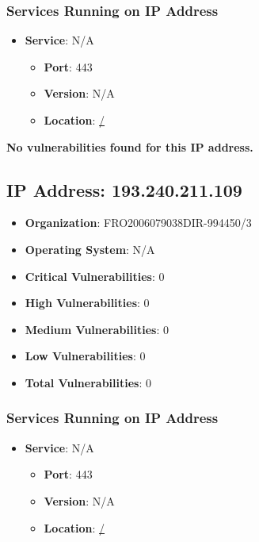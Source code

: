 \documentclass{article}
\begin{document}
\subsubsection*{Services Running on IP Address}

\begin{itemize}
    
        \item \textbf{Service}: N/A
        \begin{itemize}
            \item \textbf{Port}: 443
            \item \textbf{Version}:  N/A 
            \item \textbf{Location}: \href{ / }{ / }
        \end{itemize}
    
\end{itemize}


\textbf{No vulnerabilities found for this IP address.}




\clearpage



\subsection*{IP Address: 193.240.211.109}

\begin{itemize}
    \item \textbf{Organization}: FRO2006079038DIR-994450/3
    \item \textbf{Operating System}:  N/A 
    \item \textbf{Critical Vulnerabilities}: 0
    \item \textbf{High Vulnerabilities}: 0
    \item \textbf{Medium Vulnerabilities}: 0
    \item \textbf{Low Vulnerabilities}: 0
    \item \textbf{Total Vulnerabilities}: 0
\end{itemize}

\subsubsection*{Services Running on IP Address}

\begin{itemize}
    
        \item \textbf{Service}: N/A
        \begin{itemize}
            \item \textbf{Port}: 443
            \item \textbf{Version}:  N/A 
            \item \textbf{Location}: \href{ / }{ / }
        \end{itemize}
    
\end{itemize}
\end{document}

